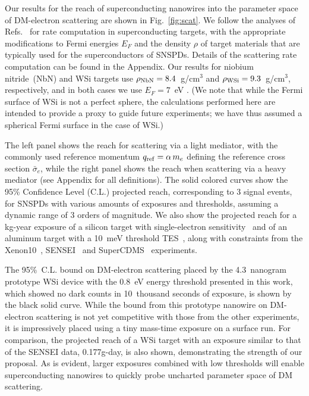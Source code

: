 \documentclass[twocolumn,10pt,prl,nofootinbib,preprintnumbers]{revtex4-1}
\begin{document}
Our results for the reach of superconducting nanowires into the
parameter space of DM-electron scattering are shown in Fig.~\ref{fig:scat}. We
follow the analyses of Refs.~\cite{Hochberg:2015pha,Hochberg:2015fth}
for rate computation in superconducting targets, with the appropriate
modifications to Fermi energies $E_F$ and the density $\rho$ of target
materials that are typically used for the superconductors of
SNSPDs. Details of the scattering rate computation can be
found in the Appendix. 
Our results for niobium nitride~(NbN) and WSi targets use $\rho_{\rm NbN}=8.4$~g/cm$^3$ and $\rho_{\rm WSi}=9.3$~g/cm$^3$, respectively, and in both cases we use $E_F=7$~eV . 
(We note that
while the Fermi surface of WSi is not a perfect sphere, the
calculations performed here are intended to provide a proxy to guide
future experiments; we have thus assumed a spherical Fermi surface in
the case of WSi.)  

The left panel shows the reach for scattering via a
light mediator, with the commonly used reference momentum
$q_{\rm ref}=\alpha\, m_e$ defining the reference cross section
$\bar \sigma_e$, while the right panel shows the reach when scattering
via a heavy mediator (see Appendix for all definitions).  The solid
colored curves show the 95\% Confidence Level (C.L.) projected reach, corresponding to 3 signal
events, for SNSPDs with various amounts of exposures and thresholds, assuming a dynamic range
of 3 orders of magnitude. 
%
We also show the projected reach for a kg-year exposure of a silicon target with
single-electron sensitivity~\cite{Essig:2015cda} and of an aluminum target with a 10~meV
threshold TES~\cite{Hochberg:2015pha,Hochberg:2015fth}, along with  constraints from the Xenon10~\cite{Essig:2012yx},
SENSEI~\cite{Abramoff:2019dfb} and SuperCDMS~\cite{Agnese:2018col}
experiments.

The 95\%~C.L. bound on DM-electron scattering placed by the 
4.3~nanogram prototype WSi device with the 0.8~eV energy threshold
presented in this work, which showed no dark counts in 10~thousand
seconds of exposure, is shown by the black solid curve.
While
the bound from this prototype nanowire on DM-electron scattering is not yet competitive with
those from the other experiments, it is impressively placed using a
tiny mass-time exposure on a surface run. For comparison, the
projected reach of a WSi target with an exposure similar to that of the
SENSEI data, 0.177g-day, is also shown,
demonstrating the strength of our proposal. As is evident, larger
exposures combined with low thresholds will enable superconducting
nanowires to quickly probe uncharted parameter space of DM scattering.
\end{document}
